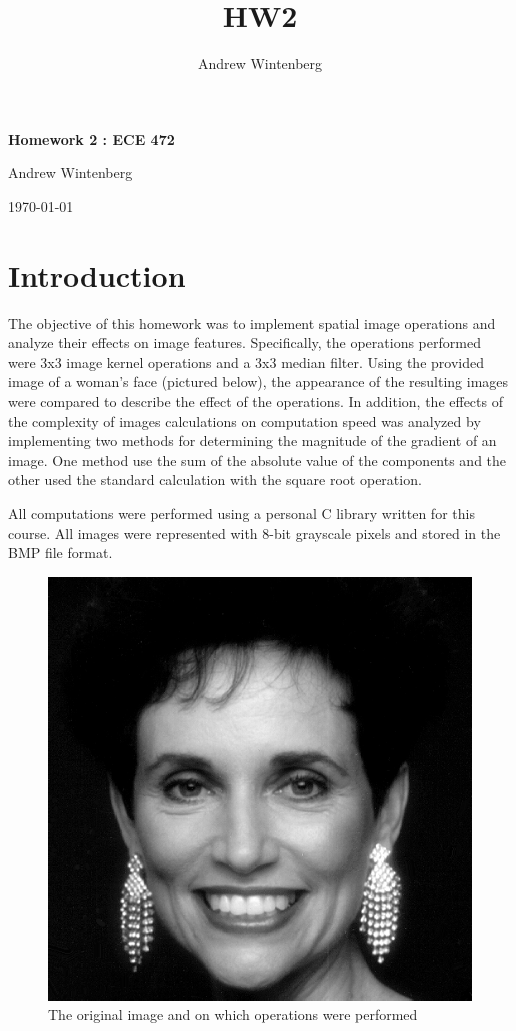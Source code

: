 \documentclass[12pt,letterpaper]{article}
\author{Andrew Wintenberg}
\title{HW2}
\begin{document}
\begin{center}
{\Large \textbf{Homework 2 : ECE 472 }}

{\large Andrew Wintenberg}

{\today}
\end{center}

\thispagestyle{empty}

\section{Introduction}

The objective of this homework was to implement spatial image operations and analyze their effects on image features. Specifically, the operations performed were 3x3 image kernel operations and a 3x3 median filter. Using the provided image of a woman's face (pictured below), the appearance of the resulting images were compared to describe the effect of the operations. In addition, the effects of the complexity of images calculations on computation speed was analyzed by implementing two methods for determining the magnitude of the gradient of an image. One method use the sum of the absolute value of the components and the other used the standard calculation with the square root operation.

All computations were performed using a personal C library written for this course. All images were represented with 8-bit grayscale pixels and stored in the BMP file format.

\begin{figure}[ht]
\centering
\includegraphics[scale=1.75]{woman/woman} \hspace{0.5cm}
\caption{\small{The original image and on which operations were performed}
\label{fig:base} }
\end{figure}
\end{document}
